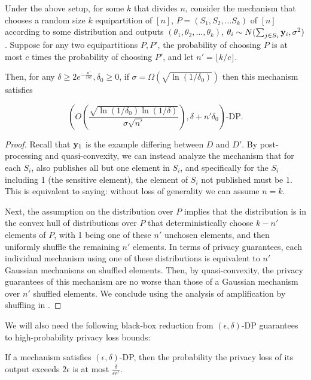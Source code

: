 \begin{lem}\label{lem:approximateshuffle-general}
Under the above setup, for some $k$ that divides $n$, consider the mechanism that chooses a random size $k$ equipartition of $[n]$, $P = (S_1, S_2, \ldots S_k)$ of $[n]$ according to some distribution and outputs $(\theta_1, \theta_2, \ldots, \theta_k)$, $\theta_i \sim N(\sum_{j \in S_i} \mathbf{y}_i, \sigma^2)$. Suppose for any two equipartitions $P, P'$, the probability of choosing $P$ is at most $c$ times the probability of choosing $P'$, and let $n' = \lfloor k / c \rfloor$.

Then, for any $\delta \geq 2e^{-\frac{n'}{16e}}, \delta_0 \geq 0$, if $\sigma = \Omega(\sqrt{\ln(1/\delta_0)})$ then this mechanism satisfies 

\[\left(O\left(\frac{\sqrt{ \ln (1/\delta_0) \ln(1/\delta)}}{\sigma \sqrt{n'}}\right), \delta + n' \delta_0\right)\text{-DP}.\]
\end{lem}
\begin{proof}
Recall that $\mathbf{y}_1$ is the example differing between $D$ and $D'$. By post-processing and quasi-convexity, we can instead analyze the mechanism that for each $S_i$, also publishes all but one element in $S_i$, and specifically for the $S_i$ including 1 (the sensitive element), the element of $S_i$ not published must be 1. This is equivalent to saying: without loss of generality we can assume $n = k$.

Next, the assumption on the distribution over $P$ implies that the distribution is in the convex hull of distributions over $P$ that deterministically choose $k-n'$ elements of $P$, with 1 being one of these $n'$ unchosen elements, and then uniformly shuffle the remaining $n'$ elements. In terms of privacy guarantees, each individual mechanism using one of these distributions is equivalent to $n'$ Gaussian mechanisms on shuffled elements. Then, by quasi-convexity, the privacy guarantees of this mechanism are no worse than those of a Gaussian mechanism over $n'$ shuffled elements. We conclude using the analysis of amplification by shuffling in \cite{HidingAmongTheClones}.
\end{proof}

We will also need the following black-box reduction from $(\epsilon, \delta)$-DP guarantees to high-probability privacy loss bounds:

\begin{lem}[\cite{KS14}]\label{lem:dp-to-pdp}
If a mechanism satisfies $(\epsilon, \delta)$-DP, then the probability the privacy loss of its output exceeds $2\epsilon$ is at most $\frac{\delta}{\epsilon e^\epsilon}$.
\end{lem}

